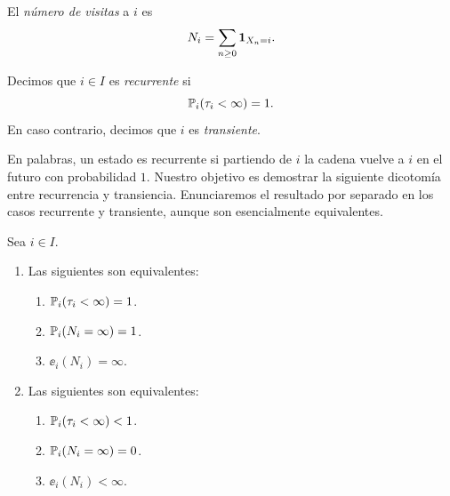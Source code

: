 \begin{defn}
El \emph{número de visitas} a $i$ es
\[N_i=\sum_{n\geq0}\mathbf{1}_{X_n=i}.\]
\end{defn}

\begin{defn}
Decimos que $i\in I$ es \emph{recurrente} si
\[\mathbb{P}_i(\tau_i<\infty)=1.\]
En caso contrario, decimos que $i$ es \emph{transiente}.
\end{defn}

En palabras, un estado es recurrente si partiendo de $i$ la cadena vuelve a $i$ en el futuro con probabilidad $1$.
Nuestro objetivo es demostrar la siguiente dicotomía entre recurrencia y transiencia.
Enunciaremos el resultado por separado en los casos recurrente y transiente, aunque son esencialmente equivalentes.

\begin{thm}\label{thm:rec-trans}
Sea $i\in I$.
\begin{enumerate}[label=\uptext{\arabic*.}]
\item {}\enspace Las siguientes son equivalentes:
\begin{enumerate}[label=\uptext{(\roman*)}]
\item $\mathbb{P}_i(\tau_i<\infty)=1$.
\item $\mathbb{P}_i(N_i=\infty)=1$.
\item $\ee_i(N_i)=\infty$.
\end{enumerate}
\item {}\enspace Las siguientes son equivalentes:
\begin{enumerate}[label=\uptext{(\roman*)}]
\item $\mathbb{P}_i(\tau_i<\infty)<1$.
\item $\mathbb{P}_i(N_i=\infty)=0$.
\item $\ee_i(N_i)<\infty$.
\end{enumerate}
\end{enumerate}
\end{thm}


